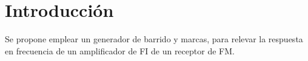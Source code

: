   \section{Introducción}
Se propone emplear un generador de barrido y marcas, para relevar la respuesta en 
frecuencia de un amplificador de FI de un receptor de FM.

